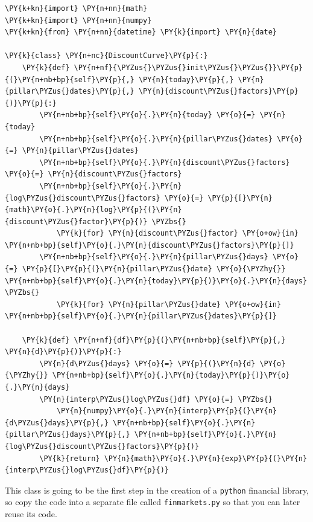 \begin{codebox}
\begin{Verbatim}[commandchars=\\\{\}]
\PY{k+kn}{import} \PY{n+nn}{math}
\PY{k+kn}{import} \PY{n+nn}{numpy}
\PY{k+kn}{from} \PY{n+nn}{datetime} \PY{k}{import} \PY{n}{date}
	
\PY{k}{class} \PY{n+nc}{DiscountCurve}\PY{p}{:}	
    \PY{k}{def} \PY{n+nf}{\PYZus{}\PYZus{}init\PYZus{}\PYZus{}}\PY{p}{(}\PY{n+nb+bp}{self}\PY{p}{,} \PY{n}{today}\PY{p}{,} \PY{n}{pillar\PYZus{}dates}\PY{p}{,} \PY{n}{discount\PYZus{}factors}\PY{p}{)}\PY{p}{:}
        \PY{n+nb+bp}{self}\PY{o}{.}\PY{n}{today} \PY{o}{=} \PY{n}{today}
        \PY{n+nb+bp}{self}\PY{o}{.}\PY{n}{pillar\PYZus{}dates} \PY{o}{=} \PY{n}{pillar\PYZus{}dates}
        \PY{n+nb+bp}{self}\PY{o}{.}\PY{n}{discount\PYZus{}factors} \PY{o}{=} \PY{n}{discount\PYZus{}factors}
        \PY{n+nb+bp}{self}\PY{o}{.}\PY{n}{log\PYZus{}discount\PYZus{}factors} \PY{o}{=} \PY{p}{[}\PY{n}{math}\PY{o}{.}\PY{n}{log}\PY{p}{(}\PY{n}{discount\PYZus{}factor}\PY{p}{)} \PYZbs{}
            \PY{k}{for} \PY{n}{discount\PYZus{}factor} \PY{o+ow}{in} \PY{n+nb+bp}{self}\PY{o}{.}\PY{n}{discount\PYZus{}factors}\PY{p}{]}
        \PY{n+nb+bp}{self}\PY{o}{.}\PY{n}{pillar\PYZus{}days} \PY{o}{=} \PY{p}{[}\PY{p}{(}\PY{n}{pillar\PYZus{}date} \PY{o}{\PYZhy{}} \PY{n+nb+bp}{self}\PY{o}{.}\PY{n}{today}\PY{p}{)}\PY{o}{.}\PY{n}{days} \PYZbs{}
            \PY{k}{for} \PY{n}{pillar\PYZus{}date} \PY{o+ow}{in} \PY{n+nb+bp}{self}\PY{o}{.}\PY{n}{pillar\PYZus{}dates}\PY{p}{]}

    \PY{k}{def} \PY{n+nf}{df}\PY{p}{(}\PY{n+nb+bp}{self}\PY{p}{,} \PY{n}{d}\PY{p}{)}\PY{p}{:}
        \PY{n}{d\PYZus{}days} \PY{o}{=} \PY{p}{(}\PY{n}{d} \PY{o}{\PYZhy{}} \PY{n+nb+bp}{self}\PY{o}{.}\PY{n}{today}\PY{p}{)}\PY{o}{.}\PY{n}{days}
        \PY{n}{interp\PYZus{}log\PYZus{}df} \PY{o}{=} \PYZbs{}
            \PY{n}{numpy}\PY{o}{.}\PY{n}{interp}\PY{p}{(}\PY{n}{d\PYZus{}days}\PY{p}{,} \PY{n+nb+bp}{self}\PY{o}{.}\PY{n}{pillar\PYZus{}days}\PY{p}{,} \PY{n+nb+bp}{self}\PY{o}{.}\PY{n}{log\PYZus{}discount\PYZus{}factors}\PY{p}{)}
        \PY{k}{return} \PY{n}{math}\PY{o}{.}\PY{n}{exp}\PY{p}{(}\PY{n}{interp\PYZus{}log\PYZus{}df}\PY{p}{)}
\end{Verbatim}
\end{codebox}

This class is going to be the first step in the creation of a \texttt{python} financial library,
so copy the code into a separate file called \texttt{finmarkets.py} so that you can later reuse 
its code.

